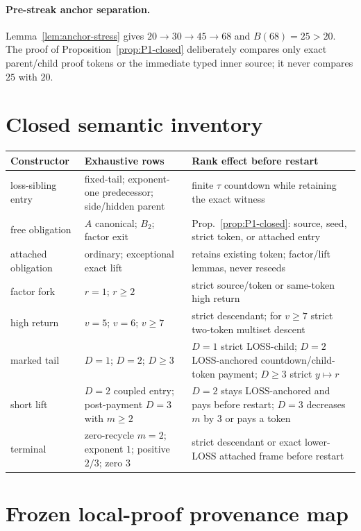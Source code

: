 \paragraph{Pre-streak anchor separation.}
Lemma~\ref{lem:anchor-stress} gives
$20\to30\to45\to68$ and $B(68)=25>20$.  The proof of
Proposition~\ref{prop:P1-closed} deliberately compares only exact parent/child
proof tokens or the immediate typed inner source; it never compares $25$ with
$20$.

\section{Closed semantic inventory}\label{app:inventory}

\begin{center}
\small
\begin{tabular}{@{}p{.22\linewidth}p{.31\linewidth}p{.37\linewidth}@{}}
\toprule
Constructor & Exhaustive rows & Rank effect before restart \\
\midrule
loss-sibling entry & fixed-tail; exponent-one predecessor; side/hidden parent &
finite $\tau$ countdown while retaining the exact witness \\
free obligation & $A$ canonical; $B_2$; factor exit &
Prop.~\ref{prop:P1-closed}: source, seed, strict token, or attached entry \\
attached obligation & ordinary; exceptional exact lift &
retains existing token; factor/lift lemmas, never reseeds \\
factor fork & $r=1$; $r\ge2$ &
strict source/token or same-token high return \\
high return & $v=5$; $v=6$; $v\ge7$ &
strict descendant; for $v\ge7$ strict two-token multiset descent \\
marked tail & $D=1$; $D=2$; $D\ge3$ &
$D=1$ strict LOSS-child; $D=2$ LOSS-anchored countdown/child-token payment; $D\ge3$ strict $y\mapsto r$ \\
short lift & $D=2$ coupled entry; post-payment $D=3$ with $m\ge2$ &
$D=2$ stays LOSS-anchored and pays before restart; $D=3$ decreases $m$ by $3$ or pays a token \\
terminal & zero-recycle $m=2$; exponent $1$; positive $2/3$; zero $3$ &
strict descendant or exact lower-LOSS attached frame before restart \\
\bottomrule
\end{tabular}
\end{center}

\section{Frozen local-proof provenance map}

